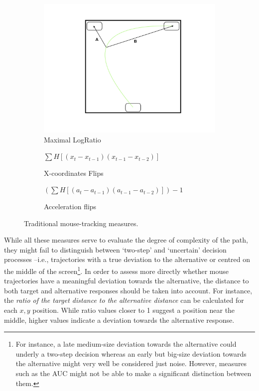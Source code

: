 \documentclass{article}
\begin{document}
\begin{figure}
\begin{subfigure}[b]{0.3\textwidth}
\includegraphics[width=\textwidth]{MaxRatio.jpeg}
\caption{Maximal LogRatio}
\end{subfigure}
\vspace{.5cm}

\begin{subfigure}[b]{0.45\textwidth}
\caption{X-coordinates Flips}
\centering
\(\sum H[(x_{t} - x_{t-1})(x_{t-1} - x_{t-2})] \)
\end{subfigure}
%
\begin{subfigure}[b]{0.45\textwidth}
\caption{Acceleration flips}
\centering
\((\sum H[( a_{t} - a_{t-1})( a_{t-1} - a_{t-2})])-1 \)

\end{subfigure}

\caption{Traditional mouse-tracking measures.}
\label{fig:traditional-measures}

\end{figure}



While all these measures serve to evaluate the degree of complexity of the path, they might fail to distinguish between `two-step' and `uncertain' decision processes --i.e., trajectories with a true deviation to the alternative or centred on the middle of the screen\footnote{For instance, a late medium-size deviation towards the alternative could underly a two-step decision whereas an early but big-size deviation towards the alternative might very well be considered just noise. However, measures such as the AUC might not be able to make a significant distinction between them.}. 
In order to assess more directly whether mouse trajectories have a meaningful deviation towards the alternative, the distance to both target and alternative responses should be taken into account. 
For instance, the \textit{ratio of the target distance to the alternative distance} can be calculated for each $x,y$ position. While ratio values closer to 1 suggest a position near the middle, higher values indicate a deviation towards the alternative response. 
\end{document}
